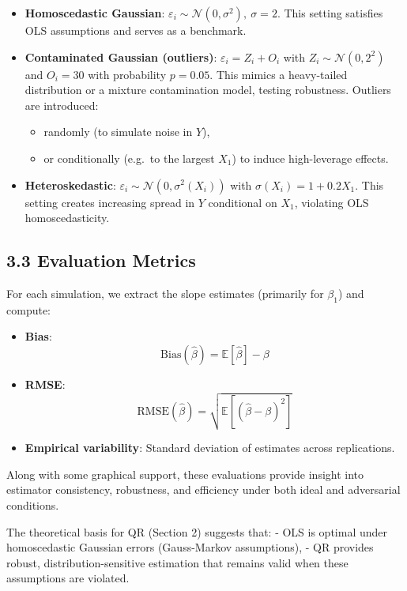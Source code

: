 \documentclass[fleqn,8pt]{latex/stylish_article} %
\providecommand{\tightlist}{%
  \setlength{\itemsep}{0pt}\setlength{\parskip}{0pt}}
\begin{document}
\begin{itemize}
\item
  \textbf{Homoscedastic Gaussian}:
  \(\varepsilon_i \sim \mathcal{N}(0, \sigma^2),\ \sigma=2\). This setting satisfies OLS assumptions and serves as a benchmark.
\item
  \textbf{Contaminated Gaussian (outliers)}:
  \(\varepsilon_i = Z_i + O_i\) with \(Z_i \sim \mathcal{N}(0,2^2)\) and \(O_i = 30\) with probability \(p = 0.05\). This mimics a heavy-tailed distribution or a mixture contamination model, testing robustness. Outliers are introduced:

  \begin{itemize}
  \tightlist
  \item
    randomly (to simulate noise in \(Y\)),
  \item
    or conditionally (e.g.~to the largest \(X_1\)) to induce high-leverage effects.
  \end{itemize}
\item
  \textbf{Heteroskedastic}:
  \(\varepsilon_i \sim \mathcal{N}(0,\sigma^2(X_i))\) with \(\sigma(X_i) = 1 + 0.2 X_1\). This setting creates increasing spread in \(Y\) conditional on \(X_1\), violating OLS homoscedasticity.
\end{itemize}

\subsection{3.3 Evaluation Metrics}\label{evaluation-metrics}

For each simulation, we extract the slope estimates (primarily for \(\beta_1\)) and compute:

\begin{itemize}
\item
  \textbf{Bias}:
  \[ 
  \text{Bias}(\hat\beta) = \mathbb{E}[\hat\beta] - \beta
  \]
\item
  \textbf{RMSE}:
  \[
  \text{RMSE}(\hat\beta) = \sqrt{\mathbb{E}[(\hat\beta - \beta)^2]}
  \]
\item
  \textbf{Empirical variability}: Standard deviation of estimates across replications.
\end{itemize}

Along with some graphical support, these evaluations provide insight into estimator consistency, robustness, and efficiency under both ideal and adversarial conditions.

The theoretical basis for QR (Section 2) suggests that:
- OLS is optimal under homoscedastic Gaussian errors (Gauss-Markov assumptions),
- QR provides robust, distribution-sensitive estimation that remains valid when these assumptions are violated.
\end{document}
